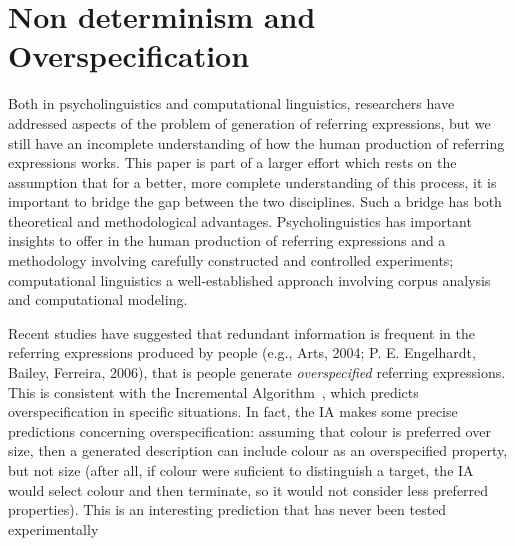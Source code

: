 \section{Non determinism and Overspecification}\label{sec:overspecification}


Both in psycholinguistics and computational linguistics, researchers have addressed aspects of the problem of generation of referring expressions, but we still have an incomplete understanding of how the human production of referring expressions works. This paper is part of a larger effort which rests on the assumption that for a better, more complete understanding of this process, it is important to bridge the gap between the two disciplines. Such a bridge has both theoretical and methodological advantages. Psycholinguistics has important insights to offer in the human production of referring expressions and a methodology involving carefully constructed and controlled experiments; computational linguistics a well-established approach involving corpus analysis and computational modeling.

Recent studies have suggested that redundant information is frequent in the referring expressions produced by people (e.g., Arts, 2004; P. E. Engelhardt, Bailey,  Ferreira, 2006), that is people generate \emph{overspecified} referring expressions. This is consistent with the Incremental Algorithm~\cite{dale95}, which predicts overspecification in specific situations. In fact, the IA makes some precise predictions concerning overspecification: assuming that colour is preferred over size, then a generated description can include colour as an overspecified property, but not size (after all, if colour were suficient to distinguish a target, the IA would select colour and then terminate, so it would not consider less preferred properties). This is an interesting prediction that has never been
tested experimentally

